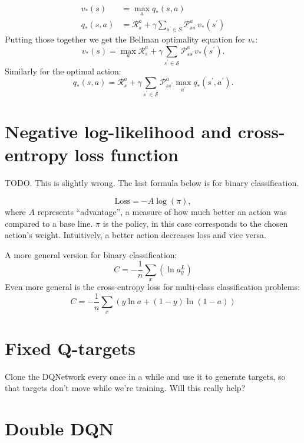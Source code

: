 \documentclass[20pt]{extarticle}
\theoremstyle{plain}
\theoremstyle{definition}
\theoremstyle{remark}
\newcommand{\0}{\varnothing}
\newcommand{\<}{\langle}
\renewcommand{\>}{\rangle}
\begin{document}
\begin{align*}
v _ { * } ( s ) &= \max _ { a } q _ { * } ( s , a ) \\
q _ { * } ( s , a ) &= \mathcal { R } _ { s } ^ { a } + \gamma \sum _ { s ^ { \prime } \in S } \mathcal { P } _ { s s ^ { ' } } ^ { a } v _ { * } \left( s ^ { \prime } \right)
\end{align*}
Putting those together we get the Bellman optimality equation for \( v_*: \)
\[
v _ { * } ( s ) = \max _ { a } \mathcal { R } _ { s } ^ { a } + \gamma \sum _ { s ^ { \prime } \in \mathcal { S } } \mathcal { P } _ { s s ^ { \prime } } ^ { a } v _ { * } \left( s ^ { \prime } \right).
\]
Similarly for the optimal action:
\[
q _ { * } ( s , a ) = \mathcal { R } _ { s } ^ { a } + \gamma \sum _ { s ^ { \prime } \in \mathcal { S } } \mathcal { P } _ { s s ^ { \prime } } ^ { a } \max _ { a ^ { \prime } } q _ { * } \left( s ^ { \prime } , a ^ { \prime } \right).
\]

\section{Negative log-likelihood and cross-entropy loss function}

TODO. This is slightly wrong. The last formula below is for binary classification.

\[
\text{Loss} = - A \log(\pi),
\]
where \( A \) represents ``advantage'', a measure of how much better an action was
compared to a base line. \( \pi \) is the policy, in this case corresponds to
the chosen action's weight. Intuitively, a better action decreases loss and vice
versa.

A more general version for binary classification:
\[
C = - \frac { 1 } { n } \sum _ { x } \left( \ln a _ { y } ^ { L } \right)
\]
Even more general is the cross-entropy loss for multi-class classification problems:
\[
C = - \frac { 1 } { n } \sum _ { x } ( y \ln a + ( 1 - y ) \ln ( 1 - a ) )
\]

\section{Fixed Q-targets}

Clone the DQNetwork every once in a while and use it to generate targets, so that targets don't move while we're training. Will this really help?

\section{Double DQN}
\end{document}
